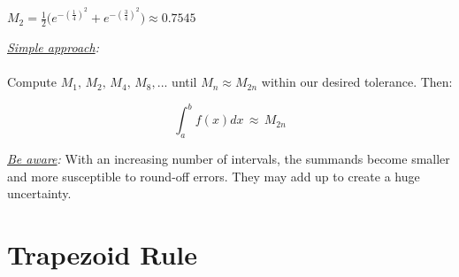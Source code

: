 \documentclass[a4paper,12pt]{report}
\begin{document}
\begin{center}
\vspace{-3mm}
	$M_2 = \frac{1}{2} \big( e^{-(\frac{1}{4})^2}+  e^{-(\frac{3}{4})^2} \big) \approx 0.7545$\\

\bigskip

\fbox
{
	\parbox{0.6\textwidth}
	{
		\noindent \textit{\underline{Simple approach}:}\\
		\vspace{-3mm}
		\\
		Compute $M_1, \, M_2, \, M_4, \, M_8, ...$ until $M_n \! \approx \! M_{2n}$ within our desired tolerance. Then:

		\begin{center}
		\vspace{-1cm}
			$$\int_{a}^{b}f(x) dx \, \approx \, M_{2n}$$
		\end{center}
	}
}
\end{center}

	\noindent \textit{\underline{Be aware}:} With an increasing number of intervals, the summands become smaller and more
	susceptible to round-off errors. They may add up to create a huge uncertainty.
	
\section{Trapezoid Rule}
\end{document}
